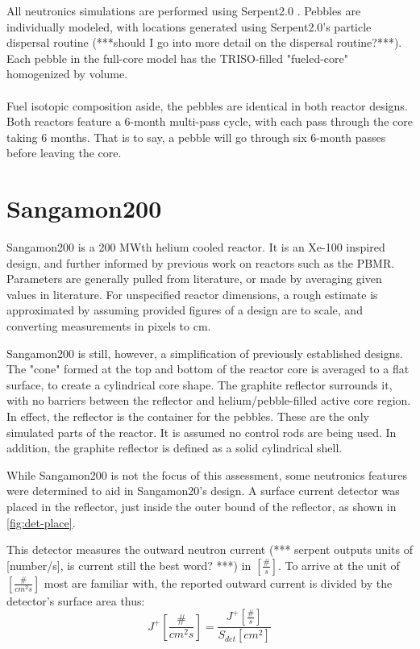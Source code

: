 

All neutronics simulations are performed using Serpent2.0 \cite{leppanenjaakko_serpent_2015} .  Pebbles are individually modeled, with locations generated using Serpent2.0's particle dispersal routine (***should I go into more detail on the dispersal routine?***).  Each pebble in the full-core model has the TRISO-filled "fueled-core" homogenized by volume.
\\




\\
Fuel isotopic composition aside, the pebbles are identical in both reactor designs.  Both reactors feature a 6-month multi-pass cycle, with each pass through the core taking 6 months.  That is to say, a pebble will go through six 6-month passes before leaving the core.

\section{Sangamon200}
Sangamon200 is a 200 MWth helium cooled reactor.  It is an Xe-100 inspired design, and further informed by previous work on reactors such as the PBMR.  Parameters are generally pulled from literature, or made by averaging given values in literature.  For unspecified reactor dimensions, a rough estimate is approximated by assuming provided figures of a design are to scale, and converting measurements in pixels to cm.

Sangamon200 is still, however, a simplification of previously established designs.  The "cone" formed at the top and bottom of the reactor core is averaged to a flat surface, to create a cylindrical core shape.  The graphite reflector surrounds it, with no barriers between the reflector and helium/pebble-filled active core region.  In effect, the reflector is the container for the pebbles.  These are the only simulated parts of the reactor.  It is assumed no control rods are being used.  In addition, the graphite reflector is defined as a solid cylindrical shell.

While Sangamon200 is not the focus of this assessment, some neutronics features were determined to aid in Sangamon20's design.  A surface current detector was placed in the reflector, just inside the outer bound of the reflector, as shown in \ref{fig:det-place}.



This detector measures the outward neutron current (*** serpent outputs units of [number/s], is current still the best word? ***) in $[\frac{\#}{s}]$.  To arrive at the unit of $[\frac{\#}{cm^2s}]$ most are familiar with, the reported outward current is divided by the detector's surface area thus:
\begin{equation}
J^+ [\frac{\#}{cm^2s}] = \frac{J^+ [\frac{\#}{s}]}{S_{det}[cm^2]}
\end{equation}


